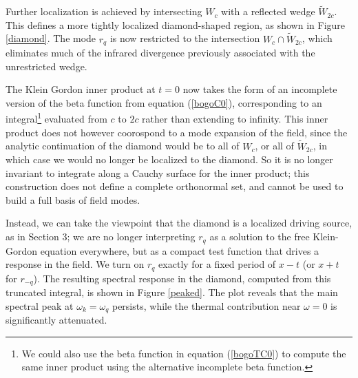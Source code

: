 \documentclass[12pt,a4paper]{article}
\begin{document}
Further localization is achieved by intersecting $W_c$ with a reflected wedge $\widetilde{W}_{2c}$. This defines a more tightly localized diamond-shaped region, as shown in Figure \ref{diamond}. The mode $r_q$ is now restricted to the intersection $W_c \cap \widetilde{W}_{2c}$, which eliminates much of the infrared divergence previously associated with the unrestricted wedge.

The Klein Gordon inner product at $t=0$ now takes the form of an incomplete version of the beta function from equation (\ref{bogoC0}), corresponding to an integral\footnote{We could also use the beta function in equation (\ref{bogoTC0}) to compute the same inner product using the alternative incomplete beta function.} evaluated from $c$ to $2c$ rather than extending to infinity. This inner product does not however coorospond to a mode expansion of the field, since the analytic continuation of the diamond would be to all of $W_c$, or all of $\widetilde{W}_{2c}$, in which case we would no longer be localized to the diamond.  So it is no longer invariant to integrate along a Cauchy surface for the inner product; this construction does not define a complete orthonormal set, and cannot be used to build a full basis of field modes.

Instead, we can take the viewpoint that the diamond is a localized driving source, as in Section 3; we are no longer interpreting $r_q$ as a solution to the free Klein-Gordon equation everywhere, but as a compact test function that drives a response in the field. We turn on $r_q$ exactly for a fixed period of $x-t$ (or $x+t$ for $r_{-q}$). The resulting spectral response in the diamond, computed from this truncated integral, is shown in Figure \ref{peaked}. The plot reveals that the main spectral peak at $\omega_k = \omega_q$ persists, while the thermal contribution near $\omega = 0$ is significantly attenuated.
\end{document}
